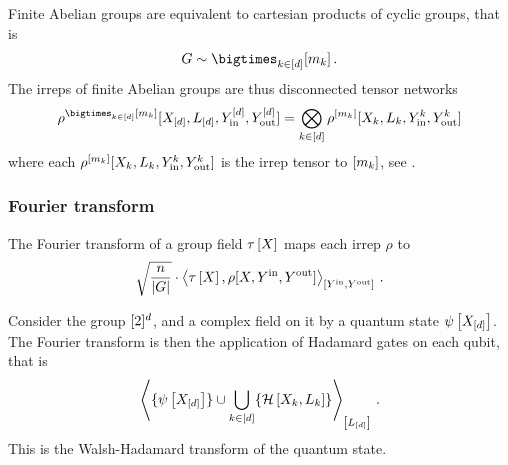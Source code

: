 Finite Abelian groups are equivalent to cartesian products of cyclic groups, that is
\begin{align*}
    G \sim \bigtimes_{\catenumeratorin}[\catdimof{\catenumerator}] \, .
\end{align*}
The irreps of finite Abelian groups are thus disconnected tensor networks
\begin{align*}
    \rho^{\bigtimes_{\catenumeratorin}[\catdimof{\catenumerator}]}[\shortcatvariables,\selvariableof{[\catorder]},\cheadvariableof{\insymbol}{[\catorder]},\cheadvariableof{\outsymbol}{[\catorder]}]
    = \bigotimes_{\catenumeratorin} \rho^{[\catdimof{\catenumerator}]}[\catvariableof{\catenumerator},\selvariableof{\catenumerator},\cheadvariableof{\insymbol}{\catenumerator},\cheadvariableof{\outsymbol}{\catenumerator}]
\end{align*}
where each $\rho^{[m_{k}]}[X_{k},L_{k},Y_{\mathrm{in}}^{k},Y_{\mathrm{out}}^{k}]$ is the irrep tensor to $[m_{k}]$, see .


\subsubsection{Fourier transform}

The Fourier transform of a group field $\tau\left[X\right]$ maps each irrep $\rho$ to
\begin{align*}
    \sqrt{\frac{n}{\left|G\right|}} \cdot \left\langle \tau\left[X\right],\rho[X,Y^{\mathrm{in}},Y^{\mathrm{out}}]\right\rangle_{\left[ Y^{\mathrm{in}},Y^{\mathrm{out}} \right]} \, .
\end{align*}

\begin{example}
    Consider the group $[2]^{d}$, and a complex field on it by a quantum state $\psi\left[X_{[d]}\right]$.
    The Fourier transform is then the application of Hadamard gates on each qubit, that is
    \begin{align*}
        \left\langle 
            \{\psi\left[X_{[d]}\right]\}
            \cup \bigcup_{k\in[d]}
            \{\mathcal{H}\left[X_{k},L_{k}\right]\}
        \right\rangle_{\left[ L_{[d]} \right]} \, .
    \end{align*}
    This is the Walsh-Hadamard transform of the quantum state.
\end{example}